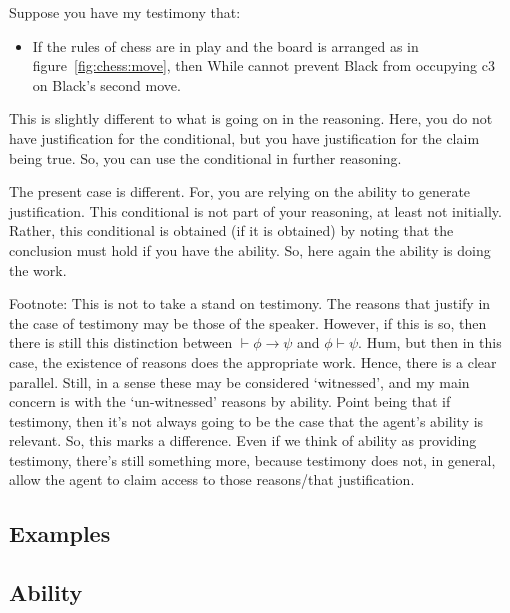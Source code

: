 \documentclass[10pt]{article}
\begin{document}
\begin{note}
  Suppose you have my testimony that:
  \begin{itemize}
  \item If the rules of chess are in play and the board is arranged as in figure~\ref{fig:chess:move}, then While cannot prevent Black from occupying c3 on Black's second move.
  \end{itemize}

  This is slightly different to what is going on in the reasoning.
  Here, you do not have justification for the conditional, but you have justification for the claim being true.
  So, you can use the conditional in further reasoning.

  The present case is different.
  For, you are relying on the ability to generate justification.
  This conditional is not part of your reasoning, at least not initially.
  Rather, this conditional is obtained (if it is obtained) by noting that the conclusion must hold if you have the ability.
  So, here again the ability is doing the work.

  {
    \color{red}
    Footnote:
    This is not to take a stand on testimony.
    The reasons that justify in the case of testimony may be those of the speaker.
    However, if this is so, then there is still this distinction between \(\vdash \phi \rightarrow \psi\) and \(\phi \vdash \psi\).
    Hum, but then in this case, the existence of reasons does the appropriate work.
    Hence, there is a clear parallel.
    Still, in a sense these may be considered `witnessed', and my main concern is with the `un-witnessed' reasons by ability.
    Point being that if testimony, then it's not always going to be the case that the agent's ability is relevant.
    So, this marks a difference.
    Even if we think of ability as providing testimony, there's still something more, because testimony does not, in general, allow the agent to claim access to those reasons/that justification.
  }
\end{note}

\subsection{Examples}
\label{sec:examples}

\subsection{Ability}
\label{sec:ability}
\end{document}
